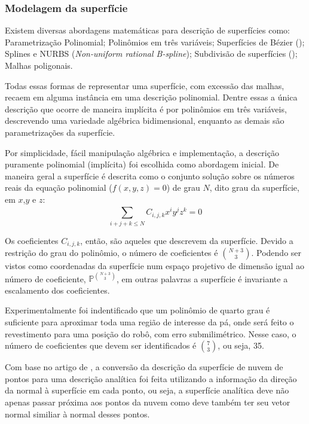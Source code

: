 \subsubsection{Modelagem da superfície}\label{modelagem}

Existem diversas abordagens matemáticas para descrição de superfícies como:
Parametrização Polinomial; Polinômios em três variáveis; Superfícies de
Bézier (\cite{farin2002curves}); Splines e NURBS (\textit{Non-uniform
rational B-spline}); Subdivisão de superfícies (\cite{peters2008subdivision}); Malhas
poligonais.

Todas essas formas de representar uma superfície, com excessão das malhas,
recaem em alguma instância em uma descrição polinomial. Dentre essas a única
descrição que ocorre de maneira implícita é por polinômios em três variáveis,
descrevendo uma variedade algébrica bidimensional, enquanto as demais são
parametrizações da superfície. 

Por simplicidade, fácil manipulação algébrica e implementação, a descrição
puramente polinomial (implícita) foi escolhida como abordagem inicial. De
maneira geral a superfície é descrita como o conjunto solução sobre os
números reais da equação polinomial ($f(x,y,z)=0$) de grau $N$, dito grau da
superfície, em $x$,$y$ e $z$:
\[\sum\limits_{i+j+k \leq N}^{} C_{i,j,k}x^iy^jz^k = 0\]

Os coeficientes $C_{i,j,k}$, então, são aqueles que descrevem da superfície.
Devido a restrição do grau do polinômio, o número de coeficientes é
$\binom{N+3}{3}$. Podendo ser vistos como coordenadas da superfície num espaço
projetivo de dimensão igual ao número de coeficiente,
$\mathbb{P}^{\binom{N+3}{3}}$, em outras palavras a superfície é invariante a
escalamento dos coeficientes.

Experimentalmente foi indentificado que um polinômio de quarto grau é suficiente
para aproximar toda uma região de interesse da pá, onde será feito o revestimento
para uma posição do robô, com erro submilimétrico. Nesse caso, o número de
coeficientes que devem ser identificados é $\binom{7}{3}$, ou seja, 35.

Com base no artigo de \cite{juttler2002least}, a conversão da descrição da
superfície de nuvem de pontos para uma descrição analítica foi feita utilizando
a informação da direção da normal à superfície em cada ponto, ou seja, a superfície analítica deve não apenas passar
próxima aos pontos da nuvem como deve também ter seu vetor normal similiar à
normal desses pontos.

